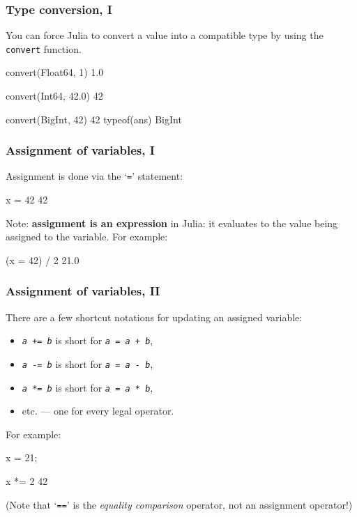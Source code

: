 \documentclass[english,serif,mathserif,xcolor=pdftex,dvipsnames,table]{beamer}
\begin{document}
\begin{frame}[fragile]
  \frametitle{Type conversion, I}
  You can force Julia to convert a value into a compatible type by
  using the \texttt{convert} function.

  \+ %
\begin{semiverbatim}
\julia convert(Float64, 1)
1.0

\julia convert(Int64, 42.0)
42

\julia convert(BigInt, 42)
42
\julia typeof(ans)
BigInt
\end{semiverbatim}
\end{frame}


\begin{frame}
  \frametitle{Assignment of variables, I}
  Assignment is done via the `\texttt{=}' statement:
\begin{semiverbatim}
\julia x = 42
42
\end{semiverbatim}

  \+ Note: \textbf{assignment is an expression} in Julia: it evaluates
  to the value being assigned to the variable.  For example:
\begin{semiverbatim}
\julia (x = 42) / 2
21.0
\end{semiverbatim}
\end{frame}


\begin{frame}[fragile]
  \frametitle{Assignment of variables, II}
  There are a few shortcut notations for updating an assigned variable:
  \begin{itemize}
  \item[] \texttt{\emph{a} += \emph{b}} is short for \texttt{\emph{a} = \emph{a} + \emph{b}},
  \item[] \texttt{\emph{a} -= \emph{b}} is short for \texttt{\emph{a} = \emph{a} - \emph{b}},
  \item[] \texttt{\emph{a} *= \emph{b}} is short for \texttt{\emph{a} = \emph{a} * \emph{b}},
  \item[]   etc. --- one for every legal operator.
  \end{itemize}

  \+ For example:
\begin{semiverbatim}
\julia x = 21;

\julia x *= 2
42
\end{semiverbatim}

  \+
  (Note that `\texttt{==}' is the \emph{equality comparison} operator, not an assignment operator!)
\end{frame}
\end{document}
